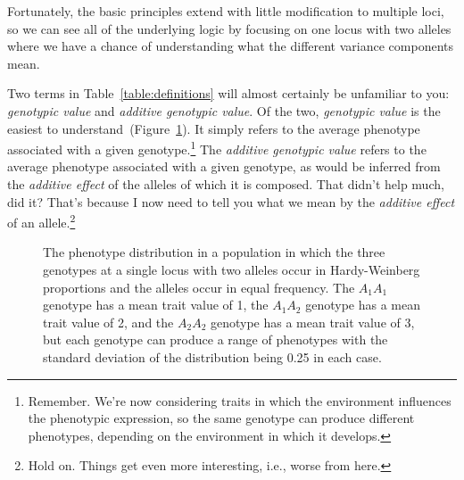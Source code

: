 \documentclass[12pt]{article}
\begin{document}
\noindent Fortunately, the basic principles extend with little
modification to multiple loci, so we can see all of the underlying
logic by focusing on one locus with two alleles where we have a chance
of understanding what the different variance components mean.

Two terms in Table~\ref{table:definitions} will almost certainly be
unfamiliar to you: {\it genotypic value\/} and {\it additive genotypic
  value}. Of the two, {\it genotypic value\/} is the easiest to
understand~(Figure~\ref{fig:genotypic-value}). It simply refers to the
average phenotype associated with a given
genotype.\footnote{Remember. We're now considering traits in which the
  environment influences the phenotypic expression, so the same
  genotype can produce different phenotypes, depending on the
  environment in which it develops.} The {\it additive genotypic
  value\/} refers to the average phenotype associated with a given
genotype, as would be inferred from the {\it additive effect\/} of the
alleles of which it is composed. That didn't help much, did it? That's
because I now need to tell you what we mean by the {\it additive
  effect\/} of an allele.\footnote{Hold on. Things get even more
  interesting, i.e., worse from here.}

\begin{figure}
\begin{center}
\end{center}
\caption{The phenotype distribution in a population in which the three
  genotypes at a single locus with two alleles occur in Hardy-Weinberg
  proportions and the alleles occur in equal frequency. The $A_1A_1$
  genotype has a mean trait value of 1, the $A_1A_2$ genotype has a
  mean trait value of 2, and the $A_2A_2$ genotype has a mean trait
  value of 3, but each genotype can produce a range of phenotypes with
  the standard deviation of the distribution being 0.25 in each
  case.}\label{fig:genotypic-value}
\end{figure}
\end{document}
